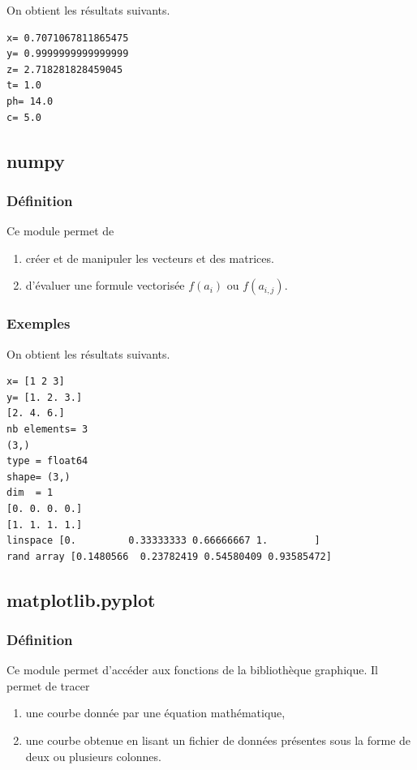 \documentclass[a4paper,12pt]{article}
\begin{document}

On obtient les résultats suivants.

\begin{verbatim}
x= 0.7071067811865475
y= 0.9999999999999999
z= 2.718281828459045
t= 1.0
ph= 14.0
c= 5.0
\end{verbatim}
\clearpage
\subsection{numpy}
\subsubsection{Définition}
\begin{leftbar}
Ce module permet de
\begin{enumerate}
\item  cr\'eer et de manipuler les vecteurs et des matrices. 
\item d'\'evaluer une formule vectoris\'ee $f(a_i)$ ou $f(a_{i,j})$.
\end{enumerate}
\end{leftbar}

\subsubsection{Exemples}


On obtient les résultats suivants.
\begin{verbatim}
x= [1 2 3]
y= [1. 2. 3.]
[2. 4. 6.]
nb elements= 3
(3,)
type = float64
shape= (3,)
dim  = 1
[0. 0. 0. 0.]
[1. 1. 1. 1.]
linspace [0.         0.33333333 0.66666667 1.        ]
rand array [0.1480566  0.23782419 0.54580409 0.93585472]
\end{verbatim}

\clearpage
\subsection{matplotlib.pyplot}
\subsubsection{Définition}
\begin{leftbar}
Ce module permet d'acc\'eder aux fonctions de la biblioth\`eque graphique.
Il permet de tracer
\begin{enumerate}
\item une courbe donnée par une équation mathématique,
\item une courbe obtenue en lisant un fichier de données présentes sous la forme de deux ou plusieurs colonnes.
\end{enumerate}
\end{leftbar}
\end{document}
